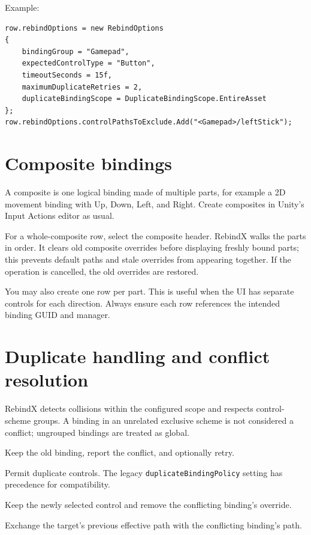 \documentclass[11pt,a4paper]{article}
\newcommand{\class}[1]{\texttt{#1}}
\begin{document}
Example:
\begin{lstlisting}[style=csharp]
row.rebindOptions = new RebindOptions
{
    bindingGroup = "Gamepad",
    expectedControlType = "Button",
    timeoutSeconds = 15f,
    maximumDuplicateRetries = 2,
    duplicateBindingScope = DuplicateBindingScope.EntireAsset
};
row.rebindOptions.controlPathsToExclude.Add("<Gamepad>/leftStick");
\end{lstlisting}

\section{Composite bindings}
A composite is one logical binding made of multiple parts, for example a 2D movement binding with Up, Down, Left, and Right. Create composites in Unity's Input Actions editor as usual.

For a whole-composite row, select the composite header. RebindX walks the parts in order. It clears old composite overrides before displaying freshly bound parts; this prevents default paths and stale overrides from appearing together. If the operation is cancelled, the old overrides are restored.

You may also create one row per part. This is useful when the UI has separate controls for each direction. Always ensure each row references the intended binding GUID and manager.

\section{Duplicate handling and conflict resolution}
RebindX detects collisions within the configured scope and respects control-scheme groups. A binding in an unrelated exclusive scheme is not considered a conflict; ungrouped bindings are treated as global.

\begin{description}[style=nextline,leftmargin=3.4cm]
  \item[Reject] Keep the old binding, report the conflict, and optionally retry.
  \item[Allow] Permit duplicate controls. The legacy \class{duplicateBindingPolicy} setting has precedence for compatibility.
  \item[Replace] Keep the newly selected control and remove the conflicting binding's override.
  \item[Swap] Exchange the target's previous effective path with the conflicting binding's path.
\end{description}
\end{document}
